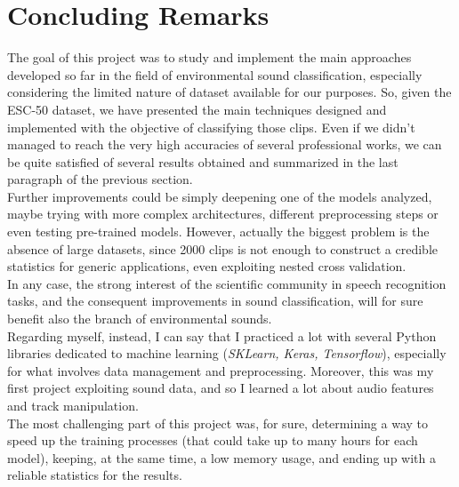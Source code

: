 
\section{Concluding Remarks}
\label{sec:conclusions}

The goal of this project was to study and implement the main approaches developed so far in the field of environmental sound classification, especially considering the limited nature of dataset available for our purposes. So, given the ESC-50 dataset, we have presented the main techniques designed and implemented with the objective of classifying those clips. Even if we didn't managed to reach the very high accuracies of several professional works, we can be quite satisfied of several results obtained and summarized in the last paragraph of the previous section.\\
Further improvements could be simply deepening one of the models analyzed, maybe trying with more complex architectures, different preprocessing steps or even testing pre-trained models. However, actually the biggest problem is the absence of large datasets, since 2000 clips is not enough to construct a credible statistics for generic applications, even exploiting nested cross validation. \\
In any case, the strong interest of the scientific community in speech recognition tasks, and the consequent improvements in sound classification, will for sure benefit also the branch of environmental sounds. \\
Regarding myself, instead, I can say that I practiced a lot with several Python libraries dedicated to machine learning (\textit{SKLearn, Keras, Tensorflow}), especially for what involves data management and preprocessing. Moreover, this was my first project exploiting sound data, and so I learned a lot about audio features and track manipulation.\\  
The most challenging part of this project was, for sure, determining a way to speed up the training processes (that could take up to many hours for each model), keeping, at the same time, a low memory usage, and ending up with a reliable statistics for the results. 




